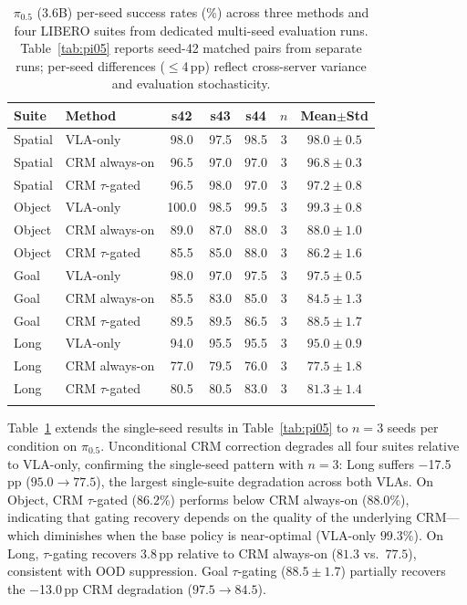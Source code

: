 \begin{table}[h]
\centering
\caption{$\pi_{0.5}$ (3.6B) per-seed success rates (\%) across three methods and four LIBERO suites from dedicated multi-seed evaluation runs. Table~\ref{tab:pi05} reports seed-42 matched pairs from separate runs; per-seed differences (${\leq}$4\,pp) reflect cross-server variance and evaluation stochasticity.}
\label{tab:pi05_multiseed}
\small
\begin{tabular}{llccccc}
\toprule
Suite & Method & s42 & s43 & s44 & $n$ & Mean$\pm$Std \\
\midrule
Spatial & VLA-only & 98.0 & 97.5 & 98.5 & 3 & $98.0 \pm 0.5$ \\
Spatial & CRM always-on & 96.5 & 97.0 & 97.0 & 3 & $96.8 \pm 0.3$ \\
Spatial & CRM $\tau$-gated & 96.5 & 98.0 & 97.0 & 3 & $97.2 \pm 0.8$ \\
\midrule
Object & VLA-only & 100.0 & 98.5 & 99.5 & 3 & $99.3 \pm 0.8$ \\
Object & CRM always-on & 89.0 & 87.0 & 88.0 & 3 & $88.0 \pm 1.0$ \\
Object & CRM $\tau$-gated & 85.5 & 85.0 & 88.0 & 3 & $86.2 \pm 1.6$ \\
\midrule
Goal & VLA-only & 98.0 & 97.0 & 97.5 & 3 & $97.5 \pm 0.5$ \\
Goal & CRM always-on & 85.5 & 83.0 & 85.0 & 3 & $84.5 \pm 1.3$ \\
Goal & CRM $\tau$-gated & 89.5 & 89.5 & 86.5 & 3 & $88.5 \pm 1.7$ \\
\midrule
Long & VLA-only & 94.0 & 95.5 & 95.5 & 3 & $95.0 \pm 0.9$ \\
Long & CRM always-on & 77.0 & 79.5 & 76.0 & 3 & $77.5 \pm 1.8$ \\
Long & CRM $\tau$-gated & 80.5 & 80.5 & 83.0 & 3 & $81.3 \pm 1.4$ \\
\bottomrule
\addlinespace[2pt]
\multicolumn{7}{l}{\scriptsize VLA-only and CRM evaluated on different servers (seed-matched).}
\end{tabular}
\end{table}

 Table~\ref{tab:pi05_multiseed} extends the single-seed results in Table~\ref{tab:pi05} to $n{=}3$ seeds per condition on $\pi_{0.5}$. Unconditional CRM correction degrades all four suites relative to VLA-only, confirming the single-seed pattern with $n{=}3$: Long suffers $-$17.5\,pp ($95.0{\to}77.5$), the largest single-suite degradation across both VLAs. On Object, CRM $\tau$-gated ($86.2$\%) performs below CRM always-on ($88.0$\%), indicating that gating recovery depends on the quality of the underlying CRM---which diminishes when the base policy is near-optimal (VLA-only $99.3$\%). On Long, $\tau$-gating recovers 3.8\,pp relative to CRM always-on ($81.3$ vs.\ $77.5$), consistent with OOD suppression. Goal $\tau$-gating ($88.5{\pm}1.7$) partially recovers the $-$13.0\,pp CRM degradation ($97.5{\to}84.5$).


